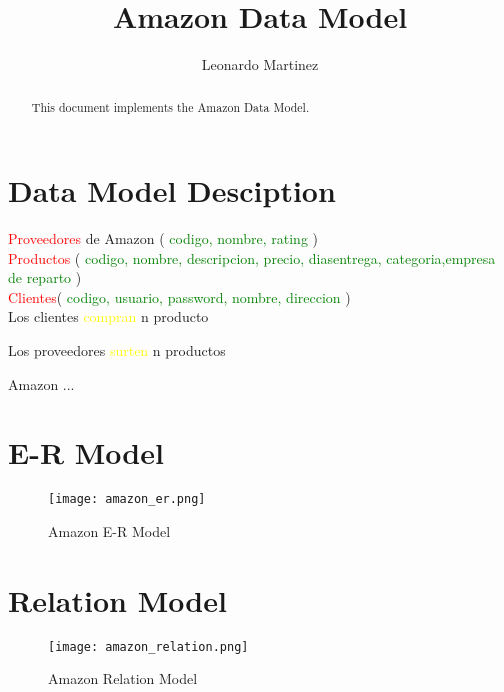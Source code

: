 \documentclass[10pt]{article}         %
\title{Amazon Data Model}
\author{Leonardo Martinez}
\begin{document}
\maketitle

\begin{abstract}
This document implements the Amazon Data Model.
\end{abstract}

\section{Data Model Desciption}


\textcolor{red}{Proveedores} de Amazon ( \textcolor{green}{codigo, nombre, rating} )\\

\textcolor{red}{Productos} ( \textcolor{green}{codigo, nombre, descripcion, precio, diasentrega, categoria,empresa de reparto} )
\\
\textcolor{red}{Clientes}( \textcolor{green}{ codigo, usuario, password, nombre, direccion} )\\

Los clientes \textcolor{yellow}{compran} n producto

Los proveedores \textcolor{yellow}{surten} n productos


Amazon ...
\section{E-R Model}
\begin{figure}[h]
     \texttt{[image: amazon\_er.png]}
     \caption{Amazon E-R Model}
\end{figure}

\section{Relation Model}
\begin{figure}[h]
     \texttt{[image: amazon\_relation.png]}
     \caption{Amazon Relation Model}
\end{figure}
\end{document}

